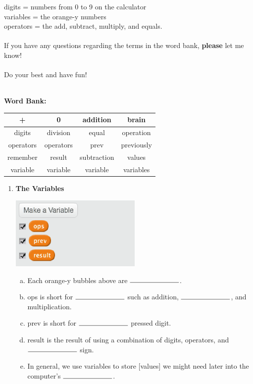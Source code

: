 \documentclass[11pt]{article}
\begin{document}
digits = numbers from 0 to 9 on the calculator\\
variables = the orange-y numbers\\
operators = the add, subtract, multiply, and equals.\\\\
If you have any questions regarding the terms in the word bank, \textbf{please} let me know!\\\\
Do your best and have fun!\\
\noindent\makebox[\linewidth]{\rule{\paperwidth}{0.4pt}}\\
\begin{center}
\textbf{Word Bank:}
\begin{tabular}{|c|c|c|c|}
    \hline
    + & 0 & addition & brain \\
    \hline
    digits & division & equal & operation \\
    \hline
    operators & operators & prev & previously \\
    \hline
    remember & result & subtraction & values \\
    \hline
    variable & variable & variable & variables \\
    \hline
\end{tabular}
\end{center}
\noindent\makebox[\linewidth]{\rule{\paperwidth}{0.4pt}}
\begin{enumerate}
\item \textbf{The Variables}
\begin{center}
  \includegraphics[width=2.5in]{vars.png}
 \end{center}
\begin{enumerate}[a.]
\item Each orange-y bubbles above are $\rule{2.5cm}{0.15mm}$.
\item ops is short for $\rule{2.5cm}{0.15mm}$ such as addition, $\rule{2.5cm}{0.15mm}$, and multiplication.
\item prev is short for $\rule{2.5cm}{0.15mm}$ pressed digit.
\item result is the result of using a combination of digits, operators, and $\rule{2.5cm}{0.15mm}$ sign.
\item In general, we use variables to store [values] we might need later into the computer's $\rule{2.5cm}{0.15mm}$.
\end{enumerate}
\end{enumerate}
\end{document}

